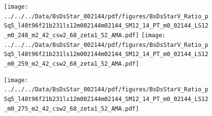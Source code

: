 \documentclass[a4paper,10pt]{article}
\begin{document}
\clearpage
\begin{figure}[p]
 \texttt{[image: ../../../Data/BsDsStar\_002144/pdf/figures/BsDsStarV\_Ratio\_pSq5\_l48t96f21b231ls12m002144m02144\_SM12\_14\_PT\_m0\_02144\_LS12\_m0\_248\_m2\_42\_csw2\_68\_zeta1\_52\_AMA.pdf]} 
 \texttt{[image: ../../../Data/BsDsStar\_002144/pdf/figures/BsDsStarV\_Ratio\_pSq5\_l48t96f21b231ls12m002144m02144\_SM12\_14\_PT\_m0\_02144\_LS12\_m0\_259\_m2\_42\_csw2\_68\_zeta1\_52\_AMA.pdf]} 
 \end{figure}
\begin{figure}[p]
 \texttt{[image: ../../../Data/BsDsStar\_002144/pdf/figures/BsDsStarV\_Ratio\_pSq5\_l48t96f21b231ls12m002144m02144\_SM12\_14\_PT\_m0\_02144\_LS12\_m0\_275\_m2\_42\_csw2\_68\_zeta1\_52\_AMA.pdf]} 
 \end{figure}
\clearpage
\end{document}
